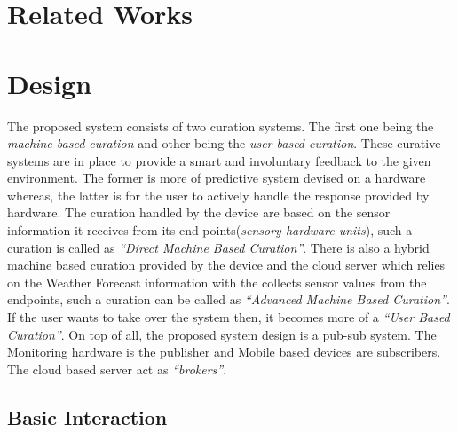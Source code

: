 \documentclass[10pt]{article}
\begin{document}

\section*{Related Works}



\section*{Design}

The proposed system consists of two curation systems. 
The first one being the \emph{machine based curation} and other being the \emph{user based curation}. 
These curative systems are in place to provide a smart and involuntary feedback to the given environment. 
The former is more of predictive system devised on a hardware whereas, the latter is for the user to actively handle the response provided by hardware. 
The curation handled by the device are based on the sensor information it receives from its end points(\emph{sensory hardware units}), such a curation is called as \emph{``Direct Machine Based Curation''}. 
There is also a hybrid machine based curation provided by the device and the cloud server which relies on the Weather Forecast information with the collects sensor values from the endpoints, such a curation can be called as \emph{``Advanced Machine Based Curation''}. 
If the user wants to take over the system then, it becomes more of a \emph{``User Based Curation''}. 
On top of all, the proposed system design is a pub-sub system. 
The Monitoring hardware is the publisher and Mobile based devices are subscribers. 
The cloud based server act as \emph{``brokers''}. 

\subsection*{Basic Interaction}
\end{document}
